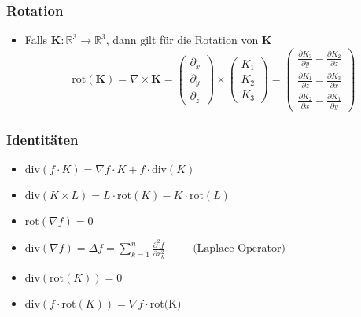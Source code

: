 \documentclass[a3paper, 11pt, landscape]{scrartcl}
\begin{document}
\begin{multicols*}{3}
    	\subsubsection{Rotation}
    		\begin{itemize}
    		    \item Falls $\textbf{K}:\mathbb{R}^3 \rightarrow \mathbb{R}^3$, dann gilt für die Rotation von $\textbf{K}$\\
    		\begin{equation*}
    			\text{rot}(\textbf{K})=\nabla \times \textbf{K}=
    			\begin{pmatrix}
    				\partial_x\\
    				\partial_y\\
    				\partial_z
    			\end{pmatrix}
    			\times
    			\begin{pmatrix}
    				K_1\\ K_2\\ K_3
    			\end{pmatrix}
    			=
    			\begin{pmatrix}
    				\frac{\partial K_3}{\partial y} - \frac{\partial K_2}{\partial z}\\[5pt]
    				\frac{\partial K_1}{\partial z} - \frac{\partial K_3}{\partial x}\\[5pt]
    				\frac{\partial K_2}{\partial x} - \frac{\partial K_1}{\partial y}
    			\end{pmatrix}
    		\end{equation*}
    		\end{itemize}
    	\subsubsection{Identitäten}
    		\begin{itemize}
    			\item $\text{div}(f\cdot K)=\nabla f \cdot K+f \cdot \text{div}(K)$
    			\item $\text{div}(K\times L)=L\cdot \text{rot}(K)-K\cdot \text{rot}(L)$
    			\item $\text{rot}(\nabla f)=0$
    			\item $\text{div}(\nabla f)=\Delta f=\sum_{k=1}^{n}\frac{\partial^2 f}{\partial x_k^2} \hspace{30pt} \text{(Laplace-Operator)}$
    			\item $\text{div}(\text{rot}(K))=0$
    			\item $\text{div}(f\cdot \text{rot}(K))=\nabla f \cdot \text{rot(K)}$
    		\end{itemize}

\end{multicols*}
\end{document}
